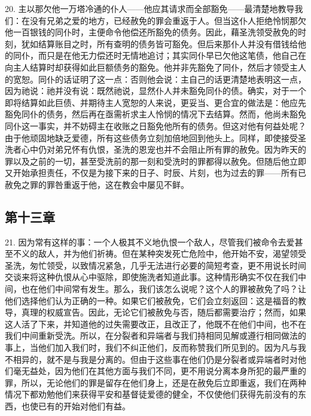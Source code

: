 20. 主以那欠他一万塔冷通的仆人——他应其请求而全部豁免——最清楚地教导我们：在没有兄弟之爱的地方，已经赦免的罪会重返于人。但当这仆人拒绝怜悯那欠他一百银钱的同仆时，主便命令他偿还所豁免的债务。因此，藉圣洗领受赦免的时刻，犹如结算账目之时，所有查明的债务皆可豁免。但后来那仆人并没有借钱给他的同仆，而只是在他无力偿还时无情地追讨；其实同仆早已欠他这笔债，他自己在向主人结算时却获得如此巨额债务的豁免。他并非先豁免了同仆，然后才领受主人的宽恕。同仆的话证明了这一点：否则他会说：主自己的话更清楚地表明这一点，因为祂说：祂并没有说：既然祂说，显然仆人并未豁免同仆的债。确实，对于一个即将结算如此巨债、并期待主人宽恕的人来说，更妥当、更合宜的做法是：他应先豁免同仆的债务，然后再在亟需祈求主人怜悯的情况下去结算。然而，他尚未豁免同仆这一事实，并不妨碍主在收账之日豁免他所有的债务。但这对他有何益处呢？由于他顽固地缺乏爱德，所有这些债务立刻加倍地回到他头上。同样，即使接受圣洗者心中仍对弟兄怀有仇恨，圣洗的恩宠也并不会阻止所有罪的赦免。因为昨天的罪以及之前的一切，甚至受洗前的那一刻和受洗时的罪都得以赦免。但随后他立即又开始承担责任，不仅是为接下来的日子、时辰、片刻，也为过去的罪——所有已赦免之罪的罪咎重返于他，这在教会中屡见不鲜。\par


\subsection{第十三章}

21. 因为常有这样的事：一个人极其不义地仇恨一个敌人，尽管我们被命令去爱甚至不义的敌人，并为他们祈祷。但在某种突发死亡危险中，他开始不安，渴望领受圣洗，匆忙领受，以致情况紧急，几乎无法进行必要的简短考查，更不用说长时间交谈来将这种仇恨从心中驱除，即使施洗者知道此事。这种情形确实不仅在我们中间，也在他们中间常有发生。那么，我们该怎么说呢？这个人的罪被赦免了吗？让他们选择他们认为正确的一种。如果它们被赦免，它们会立刻返回：这是福音的教导，真理的权威宣告。因此，无论它们被赦免与否，随后都需要治疗；然而，如果这人活了下来，并知道他的过失需要改正，且改正了，他既不在他们中间，也不在我们中间重新受洗。所以，在分裂者和异端者与我们持相同见解或遵行相同做法的事上，当他们加入我们时，我们不纠正他们，反而称赞我们所见到的。因为凡与我不相异的，就不是与我是分离的。但由于这些事在他们仍是分裂者或异端者时对他们毫无益处，因为他们在其他方面与我们不同，更不用说分离本身所犯的最严重的罪，所以，无论他们的罪是留存在他们身上，还是在赦免后立即重返，我们在两种情况下都劝勉他们来获得平安和基督徒爱德的健全，不仅使他们获得先前没有的东西，也使已有的开始对他们有益。\par

